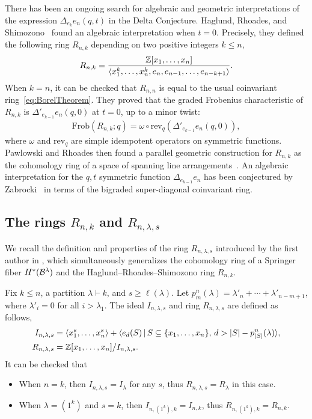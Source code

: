 \documentclass[12pt]{amsart}
\newcommand{\st}{\,|\,}
\newcommand{\la}{\lambda}
\begin{document}
There has been an ongoing search for algebraic and geometric interpretations of the expression $\Delta_{e_{k}}e_n(q,t)$ in the Delta Conjecture. Haglund, Rhoades, and Shimozono~\cite{HRS1} found an algebraic interpretation when $t=0$. Precisely, they defined the following ring $R_{n,k}$ depending on two positive integers $k\leq n$,
\begin{align}
    R_{n,k} = \frac{\mathbb{Z}[x_1,\dots, x_n]}{\langle x_1^k,\dots, x_n^k,e_n,e_{n-1},\dots, e_{n-k+1}\rangle}.
\end{align}
When $k=n$, it can be checked that $R_{n,n}$ is equal to the usual coinvariant ring~\eqref{eq:BorelTheorem}.
They proved that the graded Frobenius characteristic of $R_{n,k}$ is $\Delta'_{e_{k-1}}e_n(q,0)$ at $t=0$, up to a minor twist:
\begin{align}\label{eq:DeltaTZero}
\mathrm{Frob}(R_{n,k};q) = \omega\circ \mathrm{rev}_q (\Delta'_{e_{k-1}}e_n(q,0)),
\end{align}
where $\omega$ and $\mathrm{rev}_q$ are simple idempotent operators on symmetric functions. Pawlowski and Rhoades then found a parallel geometric construction for $R_{n,k}$ as the cohomology ring of a space of spanning line arrangements~\cite{Pawlowski-Rhoades}.
An algebraic interpretation for the $q,t$ symmetric function $\Delta_{e_{k-1}}e_n$ has been conjectured by Zabrocki~\cite{Zabrocki} in terms of the bigraded super-diagonal coinvariant ring.




\subsection{The rings $R_{n,k}$ and $R_{n,\lambda,s}$}

We recall the definition and properties of the ring $R_{n,\la,s}$ introduced by the first author in \cite{GriffinOSP}, which simultaneously generalizes the cohomology ring of a Springer fiber $H^*(\mathcal{B}^\lambda)$ and the Haglund--Rhoades--Shimozono ring $R_{n,k}$. 

Fix $k\leq n$, a partition $\la\vdash k$, and $s\geq \ell(\la)$.  Let $p^n_m(\la) = \la'_n +\cdots + \la'_{n-m+1}$, where $\la'_i= 0$ for all $i> \la_1$. The ideal $I_{n,\la,s}$ and ring $R_{n,\la,s}$ are defined as follows,
\begin{align}
I_{n,\la,s} &= \langle x_1^s,\dots, x_n^s\rangle + \langle e_d(S) \st S\subseteq \{x_1,\dots, x_n\}, \, d > |S| - p^n_{|S|}(\la)\rangle,\\
R_{n,\la,s} &= \bZ[x_1,\dots, x_n]/I_{n,\la,s}.
\end{align}
It can be checked that
\begin{itemize}
    \item When $n=k$, then $I_{n,\la,s} = I_{\lambda}$ for any $s$, thus $R_{n,\la,s} = R_\la$ in this case.
    \item When $\la = (1^k)$ and $s=k$, then $I_{n,(1^k),k} = I_{n,k}$, thus $R_{n,(1^k),k} = R_{n,k}$.
\end{itemize}
\end{document}
